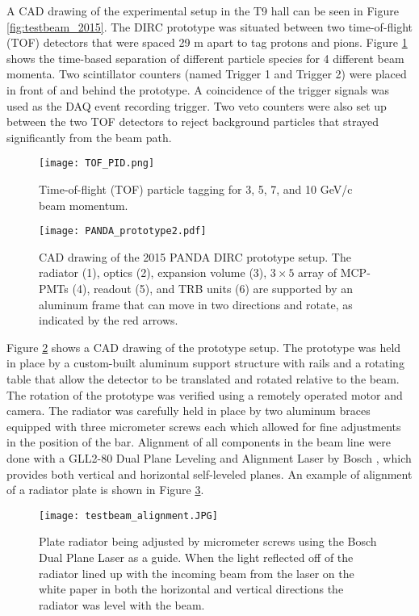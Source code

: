 A CAD drawing of the experimental setup in the T9 hall can be seen in Figure \ref{fig:testbeam_2015}. The DIRC prototype was situated between two time-of-flight (TOF) detectors that were spaced 29 m apart to tag protons and pions. Figure \ref{fig:TOF_PID} shows the time-based separation of different particle species for 4 different beam momenta. Two scintillator counters (named Trigger 1 and Trigger 2) were placed in front of and behind the prototype. A coincidence of the trigger signals was used as the DAQ event recording trigger. Two veto counters were also set up between the two TOF detectors to reject background particles that strayed significantly from the beam path.

\begin{figure}[!htb]
	\centering
	\texttt{[image: TOF\_PID.png]}
	\caption{Time-of-flight (TOF) particle tagging for 3, 5, 7, and 10 GeV/c beam momentum.}
	\label{fig:TOF_PID}
\end{figure}

\begin{figure}[!htb]
	\centering
	\texttt{[image: PANDA\_prototype2.pdf]}
	\caption{CAD drawing of the 2015 PANDA DIRC prototype setup. The radiator (1), optics (2), expansion volume (3), $3\times5$ array of MCP-PMTs (4), readout (5), and TRB units (6) are supported by an aluminum frame that can move in two directions and rotate, as indicated by the red arrows.}
	\label{fig:PANDA_prototype}
\end{figure}

Figure \ref{fig:PANDA_prototype} shows a CAD drawing of the prototype setup. The prototype was held in place by a custom-built aluminum support structure with rails and a rotating table that allow the detector to be translated and rotated relative to the beam. The rotation of the prototype was verified using a remotely operated motor and camera. The radiator was carefully held in place by two aluminum braces equipped with three micrometer screws each which allowed for fine adjustments in the position of the bar. Alignment of all components in the beam line were done with a GLL2-80 Dual Plane Leveling and Alignment Laser by Bosch \cite{BoschLaser}, which provides both vertical and horizontal self-leveled planes. An example of alignment of a radiator plate is shown in Figure \ref{fig:testbeam_alignment}. 

\begin{figure}[!htb]
	\centering
	\texttt{[image: testbeam\_alignment.JPG]}
	\caption{Plate radiator being adjusted by micrometer screws using the Bosch Dual Plane Laser as a guide. When the light reflected off of the radiator lined up with the incoming beam from the laser on the white paper in both the horizontal and vertical directions the radiator was level with the beam.}
	\label{fig:testbeam_alignment}
\end{figure}

